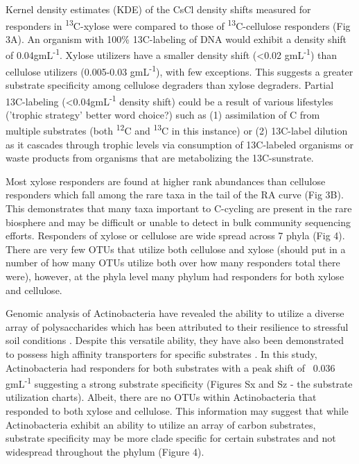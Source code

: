 Kernel density estimates (KDE) of the CsCl density shifts measured for responders in \textsuperscript{13}C-xylose were compared to those of \textsuperscript{13}C-cellulose responders (Fig 3A). An organism with 100\% 13C-labeling of DNA would exhibit a density shift of 0.04gmL\textsuperscript{-1}. Xylose utilizers have a smaller density shift (<0.02 gmL\textsuperscript{-1}) than cellulose utilizers (0.005-0.03 gmL\textsuperscript{-1}), with few exceptions. This suggests a greater substrate specificity among cellulose degraders than xylose degraders. Partial 13C-labeling (<0.04gmL\textsuperscript{-1} density shift) could be a result of various lifestyles ('trophic strategy' better word choice?) such as (1) assimilation of C from multiple substrates (both \textsuperscript{12}C and \textsuperscript{13}C in this instance) or (2) 13C-label dilution as it cascades through trophic levels via consumption of 13C-labeled organisms or waste products from organisms that are metabolizing the 13C-sunstrate.

Most xylose responders are found at higher rank abundances than cellulose responders which fall among the rare taxa in the tail of the RA curve (Fig 3B). This demonstrates that many taxa important to C-cycling are present in the rare biosphere and may be difficult or unable to detect in bulk community sequencing efforts. Responders of xylose or cellulose are wide spread across 7 phyla (Fig 4).  There are very few OTUs that utilize both cellulose and xylose (should put in a number of how many OTUs utilize both over how many responders total there were), however, at the phyla level many phylum had responders for both xylose and cellulose. 

Genomic analysis of Actinobacteria have revealed the ability to utilize a diverse array of polysaccharides which has been attributed to their resilience to stressful soil conditions \cite{Trivedi_2013}. Despite this versatile ability, they have also been demonstrated to possess high affinity transporters for specific substrates \cite{Trivedi_2013}. In this study, Actinobacteria had responders for both substrates with a peak shift of ~0.036 gmL\textsuperscript{-1} suggesting a strong substrate specificity (Figures Sx and Sz - the substrate utilization charts). Albeit, there are no OTUs within Actinobacteria that responded to both xylose and cellulose.  This information may suggest that while Actinobacteria exhibit an ability to utilize an array of carbon substrates, substrate specificity may be more clade specific for certain substrates and not widespread throughout the phylum (Figure 4).

